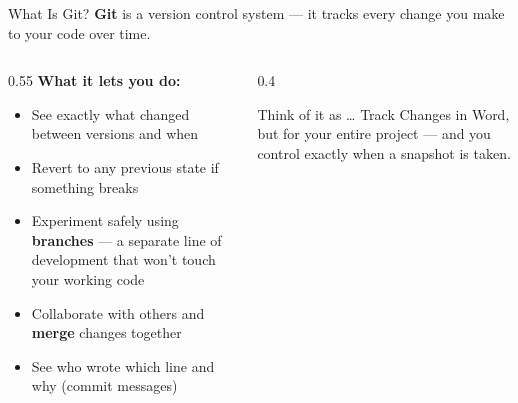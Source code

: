 \documentclass[13pt, aspectratio=169]{beamer}
\begin{document}
\begin{frame}{What Is Git?}
    \textbf{Git} is a version control system — it tracks every change you make to your code over time.

    \vspace{0.5em}
    \begin{columns}
        \begin{column}{0.55\textwidth}
            \textbf{What it lets you do:}
            \begin{itemize}
                \item See exactly what changed between versions and when
                \item Revert to any previous state if something breaks
                \item Experiment safely using \textbf{branches} — a separate line of development that won't touch your working code
                \item Collaborate with others and \textbf{merge} changes together
                \item See who wrote which line and why (commit messages)
            \end{itemize}
        \end{column}
        \begin{column}{0.4\textwidth}
            \begin{alertblock}{Think of it as \dots}
                Track Changes in Word, but for your entire project — and you control exactly when a snapshot is taken.
            \end{alertblock}
        \end{column}
    \end{columns}
\end{frame}
\end{document}
